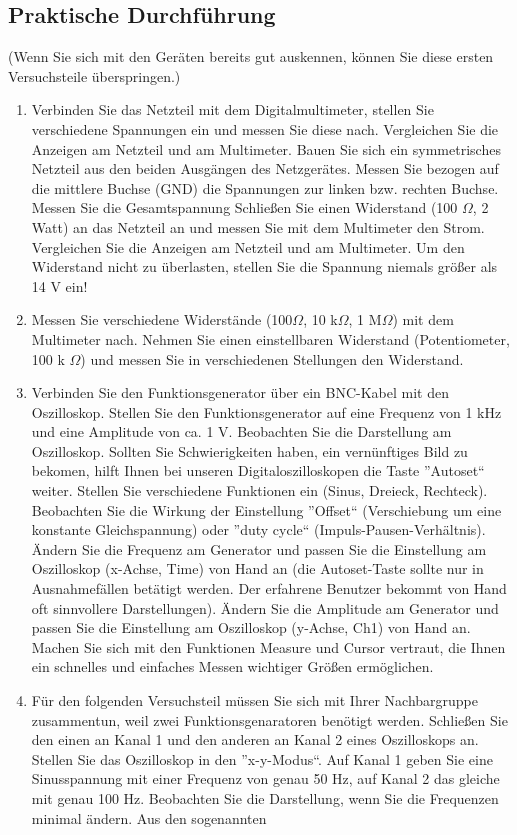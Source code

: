 \documentclass[12pt]{scrartcl}
\begin{document}
\subsection{Praktische Durchführung} 
(Wenn Sie sich mit den Geräten bereits gut auskennen, können Sie diese ersten Versuchsteile überspringen.)
\begin{enumerate}
\item
Verbinden Sie das Netzteil mit dem Digitalmultimeter, stellen Sie verschiedene Spannungen ein und messen Sie diese nach. Vergleichen Sie die Anzeigen am Netzteil und am Multimeter. Bauen Sie sich ein symmetrisches Netzteil aus den beiden Ausgängen des Netzgerätes. Messen Sie bezogen auf die mittlere Buchse (GND) die Spannungen zur linken bzw. rechten Buchse. Messen Sie die Gesamtspannung Schließen Sie einen Widerstand (100 $\Omega$, 2 Watt) an das Netzteil an und messen Sie mit dem Multimeter den Strom. Vergleichen Sie die Anzeigen am Netzteil und am Multimeter. Um den Widerstand nicht zu überlasten, stellen Sie die Spannung niemals größer als 14 V ein!
\item
Messen Sie verschiedene Widerstände (100$\Omega$, 10 k$\Omega$, 1 M$\Omega$) mit dem Multimeter nach. Nehmen Sie einen
einstellbaren Widerstand (Potentiometer, 100 k
$\Omega$) und messen Sie in verschiedenen Stellungen den Widerstand.
\item
Verbinden Sie den Funktionsgenerator über ein BNC-Kabel mit den Oszilloskop. Stellen Sie
den Funktionsgenerator auf eine Frequenz von 1 kHz und eine Amplitude von ca. 1 V. Beobachten Sie die Darstellung am Oszilloskop. Sollten Sie Schwierigkeiten haben, ein vernünftiges Bild zu bekomen, hilft Ihnen bei unseren Digitaloszilloskopen die Taste ”Autoset“ weiter. Stellen Sie verschiedene Funktionen ein (Sinus, Dreieck, Rechteck). Beobachten Sie die Wirkung der Einstellung ”Offset“ (Verschiebung um eine konstante Gleichspannung) oder ”duty cycle“ (Impuls-Pausen-Verhältnis). Ändern Sie die Frequenz am Generator und passen Sie die Einstellung am Oszilloskop (x-Achse, Time) von
Hand an (die Autoset-Taste sollte nur in Ausnahmefällen betätigt werden. Der erfahrene Benutzer bekommt von Hand oft sinnvollere Darstellungen). Ändern Sie die Amplitude am Generator und passen Sie die Einstellung am Oszilloskop (y-Achse, Ch1) von Hand an. Machen Sie sich mit den Funktionen Measure und Cursor
vertraut, die Ihnen ein schnelles und einfaches Messen wichtiger Größen ermöglichen.
\item
Für den folgenden Versuchsteil müssen Sie sich mit Ihrer Nachbargruppe zusammentun, weil zwei Funktionsgenaratoren benötigt werden. Schließen Sie den einen an Kanal 1 und den anderen an Kanal 2 eines Oszilloskops an. Stellen Sie das Oszilloskop in den ”x-y-Modus“. Auf Kanal 1 geben Sie eine Sinusspannung mit einer Frequenz von genau 50 Hz, auf Kanal 2 das gleiche mit genau 100 Hz. Beobachten Sie die Darstellung, wenn Sie die Frequenzen minimal ändern. Aus den sogenannten

\end{enumerate}
\end{document}
